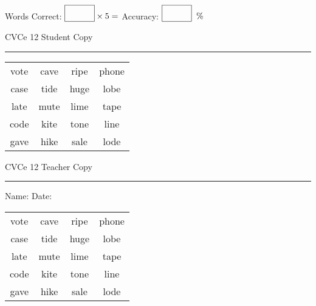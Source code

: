 \documentclass{memoir}
\begin{document}
\small

Words Correct: $\fbox{\phantom{\huge 100}} \times 5 = $ Accuracy: $\fbox{\phantom{\huge 100}}\;\; \%$ 

\vfill

\newpage


\footnotesize \noindent
CVCe 12 \hfill Student Copy
\smallskip
\hrule

\Large

\setlength{\tabcolsep}{14pt}
\def\arraystretch{2}

{\selectfont


\begin{vplace}[0.5]
\begin{center}
\begin{tabular}{cccc}
vote & cave & ripe & phone \\
case & tide & huge & lobe \\
late & mute & lime & tape \\
code & kite & tone & line \\
gave & hike & sale & lode \\
\end{tabular}
\end{center}
\end{vplace}

}

\newpage

\footnotesize \noindent
CVCe 12 \hfill Teacher Copy
\smallskip
\hrule

\small

\vfill

\noindent
Name: \underline{\hspace{1.75in}} \hfill Date: \underline{\hspace{1in}}

\Large

{\selectfont


\begin{vplace}[0.5]
\begin{center}
\begin{tabular}{cccc}
vote & cave & ripe & phone \\
case & tide & huge & lobe \\
late & mute & lime & tape \\
code & kite & tone & line \\
gave & hike & sale & lode \\
\end{tabular}
\end{center}
\end{vplace}



}
\end{document}

